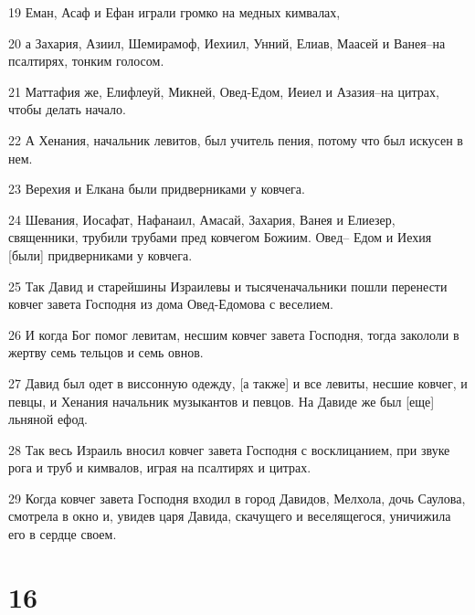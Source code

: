 \par 19 Еман, Асаф и Ефан играли громко на медных кимвалах,
\par 20 а Захария, Азиил, Шемирамоф, Иехиил, Унний, Елиав, Маасей и Ванея--на псалтирях, тонким голосом.
\par 21 Маттафия же, Елифлеуй, Микней, Овед-Едом, Иеиел и Азазия--на цитрах, чтобы делать начало.
\par 22 А Хенания, начальник левитов, был учитель пения, потому что был искусен в нем.
\par 23 Верехия и Елкана были придверниками у ковчега.
\par 24 Шевания, Иосафат, Нафанаил, Амасай, Захария, Ванея и Елиезер, священники, трубили трубами пред ковчегом Божиим. Овед-- Едом и Иехия [были] придверниками у ковчега.
\par 25 Так Давид и старейшины Израилевы и тысяченачальники пошли перенести ковчег завета Господня из дома Овед-Едомова с веселием.
\par 26 И когда Бог помог левитам, несшим ковчег завета Господня, тогда закололи в жертву семь тельцов и семь овнов.
\par 27 Давид был одет в виссонную одежду, [а также] и все левиты, несшие ковчег, и певцы, и Хенания начальник музыкантов и певцов. На Давиде же был [еще] льняной ефод.
\par 28 Так весь Израиль вносил ковчег завета Господня с восклицанием, при звуке рога и труб и кимвалов, играя на псалтирях и цитрах.
\par 29 Когда ковчег завета Господня входил в город Давидов, Мелхола, дочь Саулова, смотрела в окно и, увидев царя Давида, скачущего и веселящегося, уничижила его в сердце своем.

\chapter{16}

